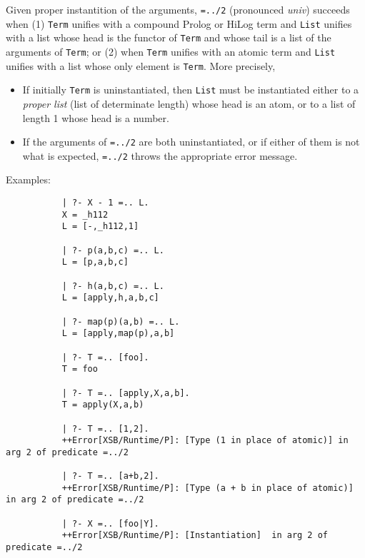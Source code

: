 \begin{description}
%
Given proper instantition of the arguments, {\tt =../2} (pronounced
{\em univ}) succeeds when (1) {\tt Term} unifies with a compound
Prolog or HiLog term and {\tt List} unifies with a list whose head is
the functor of {\tt Term} and whose tail is a list of the arguments of
{\tt Term}; or (2) when {\tt Term} unifies with an atomic term and
{\tt List} unifies with a list whose only element is {\tt Term}.  More
precisely,
    \begin{itemize}
    \item If initially {\tt Term} is uninstantiated, then {\tt List}
      must be instantiated either to a {\em proper list} (list of
      determinate length) whose head is an atom, or to a list of
      length 1 whose head is a number.
    \item If the arguments of {\tt =../2} are both uninstantiated, or
      if either of them is not what is expected, {\tt =../2} throws
      the appropriate error message.
    \end{itemize}

    Examples:
    {\footnotesize
     \begin{verbatim}
           | ?- X - 1 =.. L.
           X = _h112
           L = [-,_h112,1]

           | ?- p(a,b,c) =.. L.
           L = [p,a,b,c]

           | ?- h(a,b,c) =.. L.
           L = [apply,h,a,b,c]

           | ?- map(p)(a,b) =.. L.
           L = [apply,map(p),a,b]

           | ?- T =.. [foo].
           T = foo

           | ?- T =.. [apply,X,a,b].
           T = apply(X,a,b)

           | ?- T =.. [1,2].
           ++Error[XSB/Runtime/P]: [Type (1 in place of atomic)] in arg 2 of predicate =../2

           | ?- T =.. [a+b,2].
           ++Error[XSB/Runtime/P]: [Type (a + b in place of atomic)] in arg 2 of predicate =../2

           | ?- X =.. [foo|Y].
           ++Error[XSB/Runtime/P]: [Instantiation]  in arg 2 of predicate =../2
     \end{verbatim}}


\end{description}
